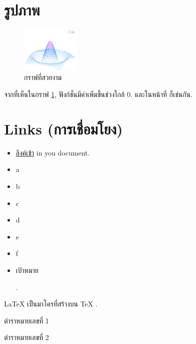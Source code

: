 \documentclass{article}
\begin{document}
\section{รูปภาพ}

\begin{figure}[h]
    \centering
    \includegraphics[width=0.25\textwidth]{mesh}
    \caption{กราฟที่สวยงาม}
    \label{fig:mesh1}
\end{figure}
 
จากที่เห็นในกราฟ \ref{fig:mesh1}, ฟังก์ชั่นมีค่าเพิ่มขึ้นช่วงใกล้ 0. และในหน้าที่ \pageref{fig:mesh1} 
ก็เช่นกัน.



\section{Links (การเชื่อมโยง)}
\begin{itemize}
    \item \hyperlink{link1}{ลิงค์เข้า} in you document.
    \item a
    \item b
    \item c
    \item d
    \item e
    \item f
    \item \hypertarget{link1}{เป้าหมาย}.
\end{itemize}




\LaTeX{} \cite{book1} เป็นมาโครที่สร้างบน \TeX{} \cite{book2}.


\begin{thebibliography}{9}
    ตำราหมายเลขที่ 1
    
    ตำราหมายเลขที่ 2

\end{thebibliography}
\end{document}

